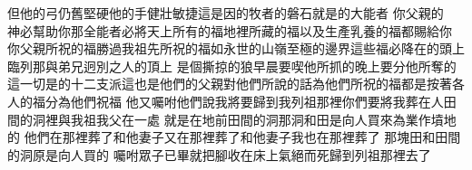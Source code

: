 但他的弓仍舊堅硬\chientien 他的手健壯敏捷\yuentien 這是因的牧者\chientien{}的磐石\chientien 就是的大能者\yuentien 
{}你父親的　神\chientien 必幫助你\chientien 那全能者\chientien 必將天上所有的福\chientien 地裡所藏的福\chientien 以及生產乳養的福\chientien 都賜給你\chuan 
{}你父親所祝的福\chientien 勝過我祖先所祝的福\chientien 如永世的山嶺\chientien 至極的邊界\chientien 這些福必降在的頭上\chientien 臨列那與弟兄迥別之人的頂上\chuan\Chuan
{}是個撕掠的狼\chientien 早晨要喫他所抓的\chientien 晚上要分他所奪的\chuan\Chuan
{}這一切是的十二支派\yuentien 這也是他們的父親對他們所說的話\chientien 為他們所祝的福\chientien 都是按著各人的福分\chientien 為他們祝福\chuan 
{}他又囑咐他們說\chientien 我將要歸到我列祖那裡\chientien 你們要將我葬在人田間的洞裡\chientien 與我祖我父在一處\chientien 
{}就是在地前\chientien{}田間的洞\yuentien 那洞和田\chientien 是向人買來為業\chientien 作墳地的\chuan 
{}他們在那裡葬了和他妻子\yuentien 又在那裡葬了\chientien 和他妻子\yuentien 我也在那裡葬了\chuan 
{}那塊田和田間的洞\chientien 原是向人買的\chuan 
{}囑咐眾子已畢\chientien 就把腳收在床上\chientien 氣絕而死\chientien 歸到列祖那裡去了\chuan 
